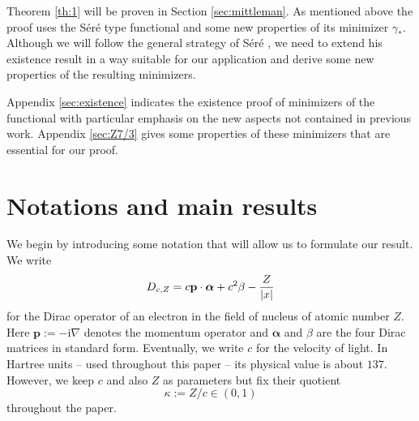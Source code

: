 \documentclass[a4paper]{amsart}
\def\bp{{\mathbf p}}
\def\ri{\mathrm{i}}
\begin{document}
Theorem \ref{th:1} will be proven in Section \ref{sec:mittleman}. As
mentioned above the proof uses the S\'er\'e type functional and some
new properties of its minimizer $\gamma_*$.  Although we will follow
the general strategy of S\'er\'e \cite{Sere2023}, we need to extend
his existence result in a way suitable for our application and derive
some new properties of the resulting minimizers.

Appendix \ref{sec:existence} indicates the existence proof of
minimizers of the functional with particular emphasis on the new
aspects not contained in previous work. Appendix \ref{sec:Z7/3} gives
some properties of these minimizers that are essential for our proof.

\section{Notations and main results}\label{mainresults}
We begin by introducing some notation that will allow us to formulate
our result.  We write
\begin{equation}
  \label{DZ}
  D_{c,Z}=c\bp\cdot\boldsymbol\alpha+c^2\beta-{Z\over|x|}
\end{equation}
for the Dirac operator of an electron in the field of nucleus of
atomic number $Z$. Here $\bp:=-\ri\nabla$ denotes the momentum
operator and $\boldsymbol\alpha$ and $\beta$ are the four Dirac
matrices in standard form.  Eventually, we write $c$ for the velocity
of light.  In Hartree units -- used throughout this paper -- its
physical value is about $137$. However, we keep $c$ and also $Z$ as
parameters but fix their quotient
\begin{equation}
  \label{kc}
  \kappa:=Z/c\in(0,1)
\end{equation}
throughout the paper.
\end{document}

